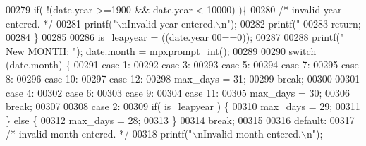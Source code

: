 \begin{DoxyCode}
{{{{{{{{{{{{{{{00279                 \textcolor{keywordflow}{if}( !(date.year >=1900 && date.year < 10000) )\{
00280                         \textcolor{comment}{/* invalid year entered. */}
00281                         printf(\textcolor{stringliteral}{"\(\backslash\)nInvalid year entered.\(\backslash\)n"});
00282                         printf(\textcolor{stringliteral}{"%
00283                         \textcolor{keywordflow}{return};
00284                 \}
00285 
00286                 is\_leapyear = ((date.year%
      00==0));
00287 
00288                 printf(\textcolor{stringliteral}{"  New MONTH: "}); date.month     = \hyperlink{mpx__util_8c_aacc3dfe470919b0bd1133bce90383e18}{mpxprompt_int}();
00289 
00290                 \textcolor{keywordflow}{switch} (date.month) \{
00291                         \textcolor{keywordflow}{case} 1:
00292                         \textcolor{keywordflow}{case} 3:
00293                         \textcolor{keywordflow}{case} 5:
00294                         \textcolor{keywordflow}{case} 7:
00295                         \textcolor{keywordflow}{case} 8:
00296                         \textcolor{keywordflow}{case} 10:
00297                         \textcolor{keywordflow}{case} 12:
00298                                 max\_days = 31;
00299                         \textcolor{keywordflow}{break};
00300 
00301                         \textcolor{keywordflow}{case} 4:
00302                         \textcolor{keywordflow}{case} 6:
00303                         \textcolor{keywordflow}{case} 9:
00304                         \textcolor{keywordflow}{case} 11:
00305                                 max\_days = 30;
00306                         \textcolor{keywordflow}{break};
00307 
00308                         \textcolor{keywordflow}{case} 2:
00309                                 \textcolor{keywordflow}{if}( is\_leapyear ) \{
00310                                         max\_days = 29;
00311                                 \} \textcolor{keywordflow}{else} \{
00312                                         max\_days = 28;
00313                                 \}
00314                         \textcolor{keywordflow}{break};
00315 
00316                         \textcolor{keywordflow}{default}:
00317                                 \textcolor{comment}{/* invalid month entered. */}
00318                                 printf(\textcolor{stringliteral}{"\(\backslash\)nInvalid month entered.\(\backslash\)n"});
}}}}}}}}}}}}}}}}
\end{DoxyCode}
